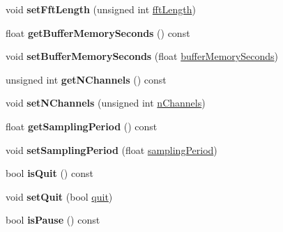 \begin{DoxyCompactItemize}
void {\bfseries set\+Fft\+Length} (unsigned int \mbox{\hyperlink{classAudioInput_a5b31598e9106da62d86d11d69a9dbd20}{fft\+Length}})
\item 
\mbox{\label{classAudioInput_a547f6144fe074436c678776f647dcf02}} 
float {\bfseries get\+Buffer\+Memory\+Seconds} () const
\item 
\mbox{\label{classAudioInput_a2ac6cfeb9f0d289cb5170d03a07472ef}} 
void {\bfseries set\+Buffer\+Memory\+Seconds} (float \mbox{\hyperlink{classAudioInput_aea3145ccca0f7cebf36a78278ca44031}{buffer\+Memory\+Seconds}})
\item 
\mbox{\label{classAudioInput_a2b531eed74caeceff65deed019976804}} 
unsigned int {\bfseries get\+N\+Channels} () const
\item 
\mbox{\label{classAudioInput_a3f4482ac752d8028e433e9543a53a83a}} 
void {\bfseries set\+N\+Channels} (unsigned int \mbox{\hyperlink{classAudioInput_a364801e7fa59b6c8ed881262b2085d42}{n\+Channels}})
\item 
\mbox{\label{classAudioInput_a261c017ca0b89a14ff0e0119bea6d8bd}} 
float {\bfseries get\+Sampling\+Period} () const
\item 
\mbox{\label{classAudioInput_afbac34c42a21c102cb0c9f8db9083da5}} 
void {\bfseries set\+Sampling\+Period} (float \mbox{\hyperlink{classAudioInput_a8b6ea4cd6b88e5cd9d051b298efbb65e}{sampling\+Period}})
\item 
\mbox{\label{classAudioInput_afeef426fc67f34a73132955f72068266}} 
bool {\bfseries is\+Quit} () const
\item 
\mbox{\label{classAudioInput_af5c79f83c5e014bdf12d3ad623e65be5}} 
void {\bfseries set\+Quit} (bool \mbox{\hyperlink{classAudioInput_aceef1c12e4f78624ed695371adf495df}{quit}})
\item 
\mbox{\label{classAudioInput_a59df92ca184977f5a400fe6d5cea33fc}} 
bool {\bfseries is\+Pause} () const
\item 
\mbox{\label{classAudioInput_abc3f83d5ce04a9628bcf658cc857d786}} 

\end{DoxyCompactItemize}
